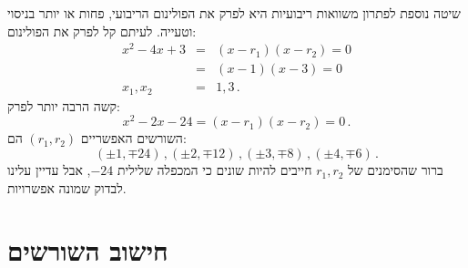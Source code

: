 \documentclass[12pt,a4paper]{article}
\begin{document}
שיטה נוספת לפתרון משוואות ריבועיות היא לפרק את הפולינום הריבועי, פחות או יותר בניסוי וטעייה. לעיתם קל לפרק את הפולינום:
\begin{eqnarray*}
x^2-4x+3& =& (x-r_1)(x-r_2)=0\\
& =& (x-1)(x-3)=0\\
x_1,x_2&=&1, 3\,.
\end{eqnarray*}
קשה הרבה יותר לפרק:
\[
x^2-2x-24= (x-r_1)(x-r_2)=0\,.
\]
השורשים האפשריים
$(r_1,r_2)$
הם:
\[
(\pm 1,\mp 24)\,, (\pm 2,\mp 12)\,, (\pm 3,\mp 8)\,, (\pm 4,\mp 6)\,.
\]
ברור שהסימנים של
$r_1,r_2$
חייבים להיות שונים כי המכפלה שלילית
$-24$,
אבל עדיין עלינו לבדוק שמונה אפשרויות.



\section{חישוב השורשים}\label{s.computing}
\end{document}
